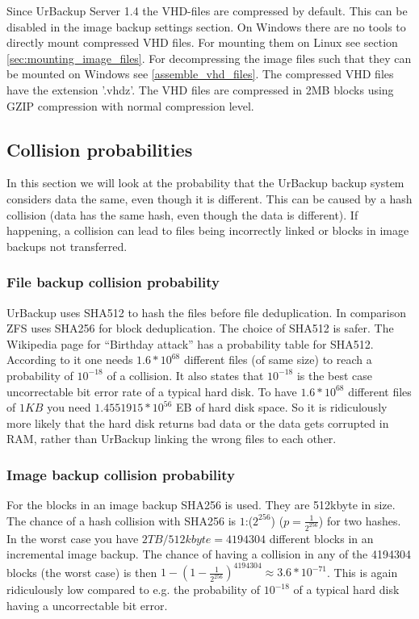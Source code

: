 \documentclass[a4paper,10pt]{article}
\begin{document}
Since UrBackup Server 1.4 the VHD-files are compressed by default. This can be disabled in the image backup settings section. On Windows there are no tools to directly mount compressed VHD files. For mounting them on Linux see section \ref{sec:mounting_image_files}. For decompressing the image files such that they can be mounted on Windows see \ref{assemble_vhd_files}. The compressed VHD files have the extension '.vhdz'. The VHD files are compressed in 2MB blocks using GZIP compression with normal compression level.

\subsection{Collision probabilities}


In this section we will look at the probability that the UrBackup backup system considers data the same, even though it is different. This can be caused by a hash collision (data has the same hash, even though the data is different). If happening, a collision can lead to files being incorrectly linked or blocks in image backups not transferred.

\subsubsection{File backup collision probability}

UrBackup uses SHA512 to hash the files before file deduplication. In comparison ZFS uses SHA256 for block deduplication. The choice of SHA512 is safer. The Wikipedia page for ``Birthday attack'' has a probability table for SHA512. According to it one needs $1.6*10^{68}$ different files (of same size) to reach a probability of $10^{-18}$ of a collision. It also states that $10^{-18}$ is the best case uncorrectable bit error rate of a typical hard disk. To have $1.6*10^{68}$ different files of $1KB$ you need $1.4551915*10^{56}$ EB of hard disk space. So it is ridiculously more likely that the hard disk returns bad data or the data gets corrupted in RAM, rather than UrBackup linking the wrong files to each other.

\subsubsection{Image backup collision probability}

For the blocks in an image backup SHA256 is used. They are 512kbyte in size. The chance of a hash collision with SHA256 is $1$:($2^{256}$) ($p=\frac{1}{2^{256}}$) for two hashes. In the worst case you have $2TB/512kbyte = 4194304$ different blocks in an incremental image backup. The chance of having a collision in any of the 4194304 blocks (the worst case) is then $1-(1-\frac{1}{2^{256}})^{4194304} \approx 3.6*10^{-71}$. This is again ridiculously low compared to e.g. the probability of $10^{-18}$ of a typical hard disk having a uncorrectable bit error.
\end{document}
